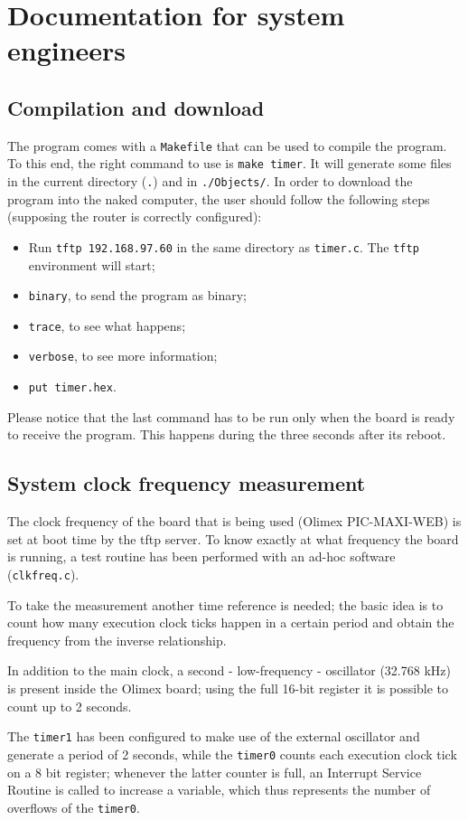 \section{Documentation for system engineers}
\subsection{Compilation and download}
The program comes with a \texttt{Makefile} that can be used to compile the program. To this end, the right command to use is \texttt{make timer}. It will generate some files in the current directory (\texttt{.}) and in \texttt{./Objects/}. In order to download the program into the naked computer, the user should follow the following steps (supposing the router is correctly configured):
\begin{itemize}
	\item Run \texttt{tftp 192.168.97.60} in the same directory as \texttt{timer.c}. The \texttt{tftp} environment will start;
	\item \texttt{binary}, to send the program as binary;
	\item \texttt{trace}, to see what happens;
	\item \texttt{verbose}, to see more information;
	\item \texttt{put timer.hex}.
\end{itemize}
Please notice that the last command has to be run only when the board is ready to receive the program. This happens during the three seconds after its reboot.

\subsection{System clock frequency measurement}
The clock frequency of the board that is being used (Olimex PIC-MAXI-WEB) is set at boot time by the tftp server. To know exactly at what frequency the board is running, a test routine has been performed with an ad-hoc software (\texttt{clkfreq.c}).

To take the measurement another time reference is needed; the basic idea is to count how many execution clock ticks happen in a certain period and obtain the frequency from the inverse relationship.

In addition to the main clock, a second - low-frequency - oscillator (32.768 kHz) is present inside the Olimex board; using the full 16-bit register it is possible to count up to 2 seconds.

The \texttt{timer1} has been configured to make use of the external oscillator and generate a period of 2 seconds, while the \texttt{timer0} counts each execution clock tick on a 8 bit register; whenever the latter counter is full, an Interrupt Service Routine is called to increase a variable, which thus represents the number of overflows of the \texttt{timer0}.\\

